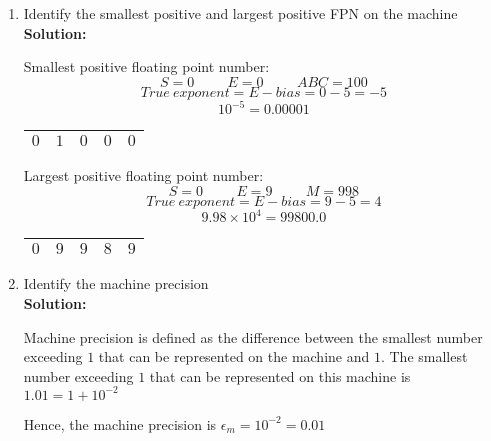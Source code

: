 \documentclass{article}
\begin{document}
\begin{enumerate}
\begin{enumerate}
\begin{itemize}
\end{itemize}

\vspace{1cm}

\item Identify the smallest positive and largest positive FPN on the machine \\

\textbf{Solution:}

Smallest positive floating point number:
        $$S = 0 \hspace{1cm} E = 0 \hspace{1cm} ABC = 100$$
        $$ True \ exponent = E - bias = 0 - 5 = -5$$
        $$10^{-5} = 0.00001$$

\begin{center}
\renewcommand{\arraystretch}{1.7}
\begin{tabular}{|c|c|c|c|c|}
\hline
$0$ & $1$ & $0$ & $0$ & $0$ \\
\hline
\end{tabular}
\end{center}

Largest positive floating point number:
        $$S = 0 \hspace{1cm} E = 9 \hspace{1cm} M = 998$$
        $$True \ exponent = E - bias = 9 - 5 = 4$$
        $$9.98 \times 10^{4} = 99800.0$$

\begin{center}
\renewcommand{\arraystretch}{1.7}
\begin{tabular}{|c|c|c|c|c|}
\hline
$0$ & $9$ & $9$ & $8$ & $9$ \\
\hline
\end{tabular}
\end{center}

\vspace{1cm}

\item Identify the machine precision \\

\textbf{Solution:}

Machine precision is defined as the difference between the smallest number exceeding
$1$ that can be represented on the machine and $1$. The smallest number exceeding $1$ that
can be represented on this machine is $1.01 = 1 + 10^{-2}$

Hence, the machine precision is $\epsilon_{m} = 10^{-2} = 0.01$

\vspace{1cm}


\end{enumerate}
\end{enumerate}
\end{document}
